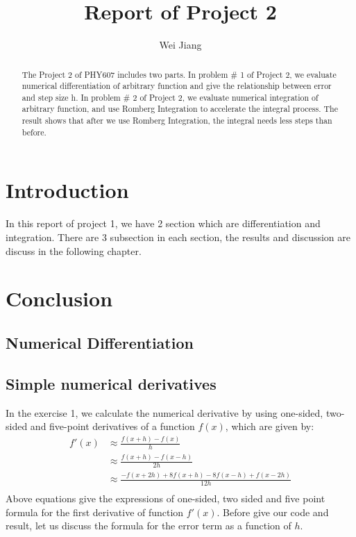 \documentclass{article}
\begin{document}
\title{Report of Project 2}
\author{Wei Jiang}

\maketitle

\begin{abstract}
The Project 2 of PHY607 includes two parts.
In problem \# 1 of Project 2, we evaluate numerical differentiation of arbitrary function and give the relationship between error and step size h.
In problem \# 2 of Project 2, we evaluate numerical integration of arbitrary function, and use Romberg Integration to accelerate the integral process. The result shows that after we use Romberg Integration, the integral needs less steps than before.
\end{abstract}



\section{Introduction}

In this report of project 1, we have 2 section which are differentiation and integration. There are 3 subsection in each section, the results and discussion are discuss in the following chapter. 


\section{Conclusion}
\subsection{Numerical Differentiation}
\subsection{ Simple numerical derivatives}
In the exercise 1, we calculate the numerical derivative by using one-sided, two-sided and five-point derivatives of a function $f(x)$, which are given by:
\begin{equation}
\begin{split}
f'(x) &\approx \frac{f(x + h) - f(x)}{h} \\
       &\approx \frac{f(x + h) - f(x - h)}{2h}\\
       &\approx \frac{-f(x + 2h) + 8f(x + h) - 8f(x - h) + f(x - 2h)}{12h}\\
\end{split}
\end{equation}
Above equations give the expressions of one-sided, two sided and five point formula for the first derivative of function $f'(x)$. Before give our code and result, let us discuss the formula for the error term as a function of $h$.
\end{document}
